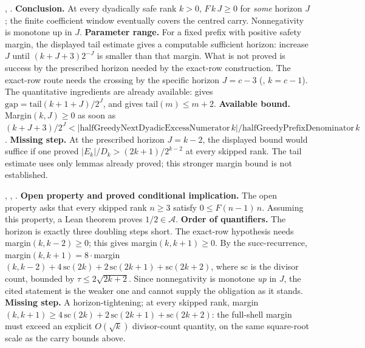 \begin{obs}
,
.
\textbf{Conclusion.} At every dyadically safe rank $k>0$, $\ensuremath{F}\,k\,J \ge
0$ for \emph{some} horizon $J$; the finite coefficient window eventually covers the centred
carry. Nonnegativity is monotone up in $J$.
\textbf{Parameter range.} For a fixed prefix with positive safety margin,
the displayed tail estimate gives a computable sufficient horizon: increase
$J$ until $(k+J+3)2^{-J}$ is smaller than that margin. What is not proved is
success by the prescribed horizon needed by the exact-row construction.
The exact-row route needs the crossing by the specific horizon $J=c-3$
(,
$k=c-1$). The quantitative ingredients are already available:
 gives
$\mathrm{gap}=\mathrm{tail}(k{+}1{+}J)/2^J$, and
 gives $\mathrm{tail}(m)\le m+2$.
\textbf{Available bound.} Margin$(k,J)\ge0$ as soon as $(k{+}J{+}3)/2^J <
|\mathrm{halfGreedyNextDyadicExcessNumerator}\,k|/\mathrm{halfGreedyPrefixDenominator}\,k$.
\textbf{Missing step.} At the prescribed horizon $J=k-2$, the displayed bound
would suffice if one proved
$|E_k|/D_k > (2k{+}1)/2^{k-2}$ at every skipped rank.
The tail estimate uses only lemmas already proved; this stronger margin
bound is not established.
\end{obs}

\begin{obs}
,
,
.
\textbf{Open property and proved conditional implication.} The open property asks
that every skipped rank $n\ge3$ satisfy
$0\le\ensuremath{F}(n{-}1)\,n$. Assuming this property, a Lean theorem proves
$1/2\in\ensuremath{\mathcal A}$.
\textbf{Order of quantifiers.} The horizon is exactly three doubling steps short.
The exact-row hypothesis needs margin$(k,k{-}2)\ge0$; this gives margin$(k,k{+}1)\ge0$. By the
succ-recurrence, margin$(k,k{+}1)=8\cdot$margin$(k,k{-}2)+4\,\mathrm{sc}(2k)+2\,\mathrm{sc}(2k{+}1)
+\mathrm{sc}(2k{+}2)$, where $\mathrm{sc}$ is the divisor count, bounded by $\tau\le 2\sqrt{2k+2}$. Since
nonnegativity is monotone \emph{up} in $J$, the cited statement is the weaker one and cannot
supply the obligation as it stands.
\textbf{Missing step.} A horizon-tightening; at every skipped rank, margin$(k,k{+}1) \ge
4\,\mathrm{sc}(2k)+2\,\mathrm{sc}(2k{+}1)+\mathrm{sc}(2k{+}2)$: the full-shell margin must exceed
an explicit $O(\sqrt k)$ divisor-count quantity, on the same square-root scale as the carry
bounds above.
\end{obs}

